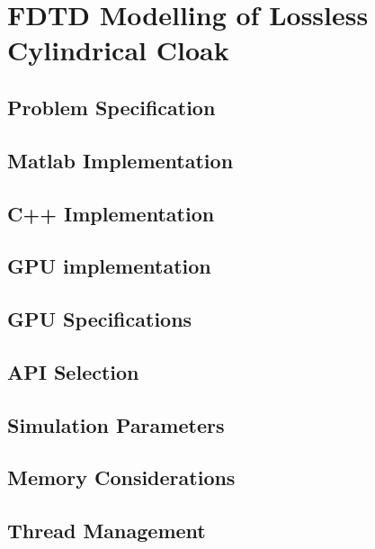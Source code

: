\chapter{FDTD Modelling of Lossless Cylindrical Cloak}
\section{Problem Specification}
\section{Matlab Implementation}
\section{C++ Implementation}
\section{GPU implementation}
\section{GPU Specifications}
\section{API Selection}
\section{Simulation Parameters}
\section{Memory Considerations}
\section{Thread Management}
